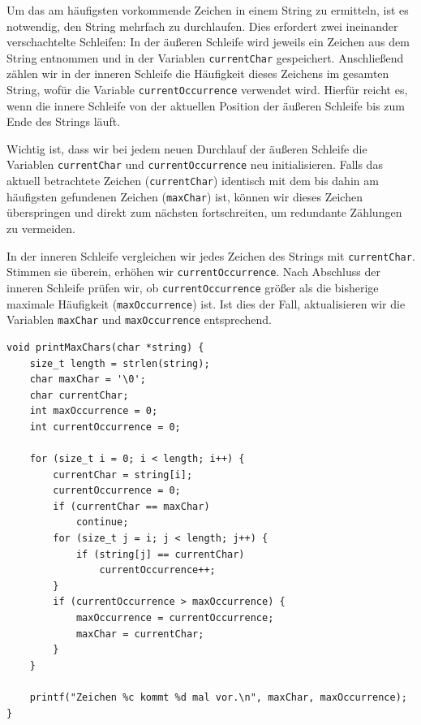 Um das am häufigsten vorkommende Zeichen in einem String zu ermitteln, ist es
notwendig, den String mehrfach zu durchlaufen. Dies erfordert zwei ineinander
verschachtelte Schleifen: In der äußeren Schleife wird jeweils ein Zeichen aus
dem String entnommen und in der Variablen \texttt{currentChar}
gespeichert. Anschließend zählen wir in der inneren Schleife die Häufigkeit
dieses Zeichens im gesamten String, wofür die Variable
\texttt{currentOccurrence} verwendet wird. Hierfür reicht es, wenn die
innere Schleife von der aktuellen Position der äußeren Schleife bis zum Ende des
Strings läuft.

Wichtig ist, dass wir bei jedem neuen Durchlauf der äußeren Schleife die
Variablen \texttt{currentChar} und \texttt{currentOccurrence} neu
initialisieren. Falls das aktuell betrachtete Zeichen
(\texttt{currentChar}) identisch mit dem bis dahin am häufigsten
gefundenen Zeichen (\texttt{maxChar}) ist, können wir dieses Zeichen
überspringen und direkt zum nächsten fortschreiten, um redundante Zählungen zu
vermeiden.

In der inneren Schleife vergleichen wir jedes Zeichen des Strings mit
\texttt{currentChar}. Stimmen sie überein, erhöhen wir
\texttt{currentOccurrence}. Nach Abschluss der inneren Schleife prüfen
wir, ob \texttt{currentOccurrence} größer als die bisherige maximale
Häufigkeit (\texttt{maxOccurrence}) ist. Ist dies der Fall, aktualisieren
wir die Variablen \texttt{maxChar} und \texttt{maxOccurrence}
entsprechend.

\begin{verbatim}
void printMaxChars(char *string) {
    size_t length = strlen(string);
    char maxChar = '\0';
    char currentChar;
    int maxOccurrence = 0;
    int currentOccurrence = 0;

    for (size_t i = 0; i < length; i++) {
        currentChar = string[i];
        currentOccurrence = 0;
        if (currentChar == maxChar)
            continue;
        for (size_t j = i; j < length; j++) {
            if (string[j] == currentChar)
                currentOccurrence++;
        }
        if (currentOccurrence > maxOccurrence) {
            maxOccurrence = currentOccurrence;
            maxChar = currentChar;
        }
    }

    printf("Zeichen %c kommt %d mal vor.\n", maxChar, maxOccurrence);
}
\end{verbatim}





